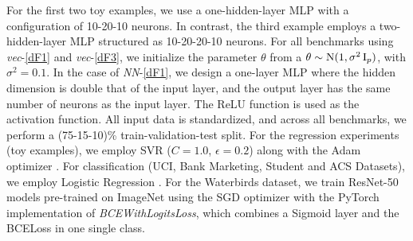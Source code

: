 \begin{table}[ht]
    \centering
    \label{tab:worst_group_acc_appx}
    \setlength{\tabcolsep}{4pt}  %
    \caption{Worst group accuracy for benchmark methods on various datasets performed in Section 5.2. We can see that on almost all datasets, diFFOCI performs competitively.}

\end{table}




For the first two toy examples, we use a one-hidden-layer MLP with a configuration of 10-20-10 neurons. In contrast, the third example employs a two-hidden-layer MLP structured as 10-20-20-10 neurons. For all benchmarks using \textit{vec}-\ref{dF1} and \textit{vec}-\ref{dF3}, we initialize the parameter $\theta$ from a $\theta\sim \mathrm{N}(1, \sigma^2\operatorname{I}_p)$, with $\sigma^2=0.1$. In the case of \textit{NN}-\ref{dF1}, we design a one-layer MLP where the hidden dimension is double that of the input layer, and the output layer has the same number of neurons as the input layer. The ReLU function is used as the activation function. All input data is standardized, and across all benchmarks, we perform a (75-15-10)\% train-validation-test split. For the regression experiments (toy examples), we employ SVR ($C=1.0$, $\epsilon=0.2$) along with the Adam optimizer \citep{kingma2017adammethodstochasticoptimization}. For classification (UCI, Bank Marketing, Student and ACS Datasets), we employ Logistic Regression \citep{cox1958regression}. For the Waterbirds dataset, we train ResNet-50 models pre-trained on ImageNet \citep{imagenet} using the SGD optimizer with the PyTorch \citep{paszke2017automatic} implementation of \textit{BCEWithLogitsLoss}, which combines a Sigmoid layer and the BCELoss in one single class.


